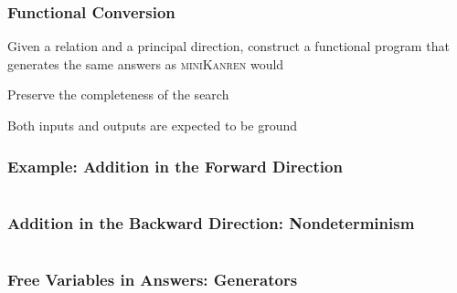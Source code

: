 \documentclass[xcolor=table, aspectratio=169]{beamer}
\newcommand{\mk}{\textsc{miniKanren}\xspace}
\begin{document}
\begin{frame}[fragile]
  \frametitle{Functional Conversion}
\begin{center}
  Given a relation and a principal direction, construct a functional program that generates the same answers as \mk would
\end{center}

\vfill

\begin{center}
  Preserve the completeness of the search
\end{center}

\vfill

\begin{center}
Both inputs and outputs are expected to be ground
\end{center}
\end{frame}

\lstset{basicstyle=\small}

\begin{frame}[fragile]
  \frametitle{Example: Addition in the Forward Direction}
\begin{columns}
  \begin{column}[t]{0.49\textwidth}
    
  \end{column}
  \begin{column}[t]{0.49\textwidth}
    
  \end{column}
\end{columns}
\end{frame}

\begin{frame}[fragile]
  \frametitle{Addition in the Backward Direction: Nondeterminism}
\begin{columns}
  \begin{column}[t]{0.49\textwidth}
    
  \end{column}
  \begin{column}[t]{0.49\textwidth}
    
  \end{column}
\end{columns}
\end{frame}

\begin{frame}[fragile]
  \frametitle{Free Variables in Answers: Generators}
\begin{columns}
  \begin{column}[t]{0.49\textwidth}
    
  \end{column}
  \begin{column}[t]{0.49\textwidth}
    
  \end{column}
\end{columns}
\end{frame}
\end{document}

